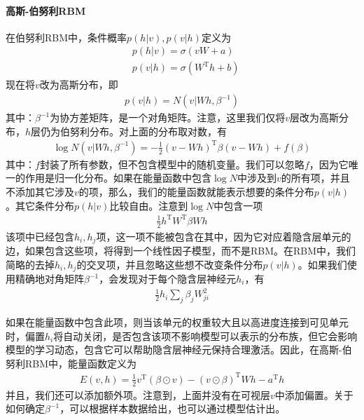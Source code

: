         \paragraph{高斯-伯努利RBM}在伯努利RBM中，条件概率$p(h|v),p(v|h)$定义为
        \begin{align*}
        & p(h|v) = \sigma (vW +a)\\
        & p(v|h) = \sigma (W^\mathrm{T}h+b)
        \end{align*}
        现在将$v$改为高斯分布，即
        \begin{align*}
        p(v|h) =N(v|Wh,\beta^{-1})
        \end{align*}
        其中：$\beta^{-1}$为协方差矩阵，是一个对角矩阵。注意，这里我们仅将$v$层改为高斯分布，$h$层仍为伯努利分布。对上面的分布取对数，有
        \begin{align*}
        \log N(v|Wh,\beta^{-1}) = -\frac{1}{2} (v-Wh)^\mathrm{T}\beta (v-Wh) + f(\beta)
        \end{align*}
        其中：$f$封装了所有参数，但不包含模型中的随机变量。我们可以忽略$f$，因为它唯一的作用是归一化分布。如果在能量函数中包含$\log N$中涉及到$v$的所有项，并且不添加其它涉及$v$的项，那么，我们的能量函数就能表示想要的条件分布$p(v|h)$。其它条件分布$p(h|v)$比较自由。注意到$\log N$中包含一项
        \begin{align*}
        \frac{1}{2} h^\mathrm{T}W^\mathrm{T}\beta Wh
        \end{align*}
        该项中已经包含$h_i,h_j$项，这一项不能被包含在其中，因为它对应着隐含层单元的边，如果包含这些项，将得到一个线性因子模型，而不是RBM。在RBM中，我们简略的去掉$h_i,h_j$的交叉项，并且忽略这些想不改变条件分布$p(v|h)$。如果我们使用精确地对角矩阵$\beta^{-1}$，会发现对于每个隐含层神经元$h_i$，有
        \begin{align*}
        \frac{1}{2}h_i \sum_j \beta_j W_{ji}^2
        \end{align*}
        \par
        如果在能量函数中包含此项，则当该单元的权重较大且以高进度连接到可见单元时，偏置$h_i$将自动关闭，是否包含该项不影响模型可以表示的分布族，但它会影响模型的学习动态，包含它可以帮助隐含层神经元保持合理激活。因此，在高斯-伯努利RBM中，能量函数定义为
        \begin{align*}
        E(v,h) = \frac{1}{2} v^\mathrm{T}(\beta \odot v) - (v\odot \beta)^\mathrm{T} Wh -a^\mathrm{T} h
        \end{align*}
        并且，我们还可以添加额外项。注意到，上面并没有在可视层$v$中添加偏置。关于如何确定$\beta^{-1}$，可以根据样本数据给出，也可以通过模型估计出。
